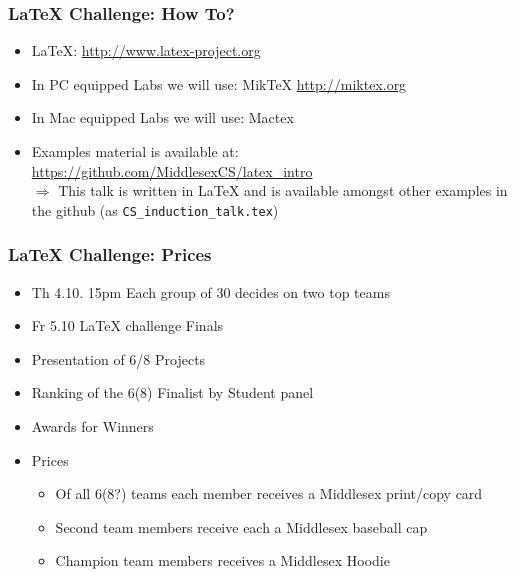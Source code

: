 \documentclass{beamer}
\begin{document}
\begin{frame}
\frametitle{LaTeX Challenge: How To?}
\begin{itemize}
\item LaTeX: \url{http://www.latex-project.org}
\item In PC equipped Labs we will use: MikTeX \url{http://miktex.org}
\item In Mac equipped Labs we will use: Mactex 
\item Examples material is available at: 
\url{https://github.com/MiddlesexCS/latex_intro} \\
\alert{$\Rightarrow$} This talk is written in LaTeX
  and is available amongst other examples in the github (as \texttt{CS\_induction\_talk.tex})
\end{itemize}
\end{frame}

\begin{frame}
\frametitle{LaTeX Challenge: Prices}
\begin{itemize}
\item \alert{Th 4.10. 15pm} Each group of 30 decides on two top teams
\item \alert{Fr 5.10} LaTeX challenge Finals
\item Presentation of 6/8 Projects
\item Ranking of the 6(8) Finalist by Student panel 
\item Awards for Winners
\item \alert{Prices}
\begin{itemize}
\item<1-3> Of all 6(8?) teams each member receives a Middlesex print/copy card
\item<2-3> Second team members receive each a Middlesex baseball cap
\item<3> Champion team members receives a Middlesex Hoodie
\end{itemize}
\end{itemize}
\end{frame}
\end{document}

